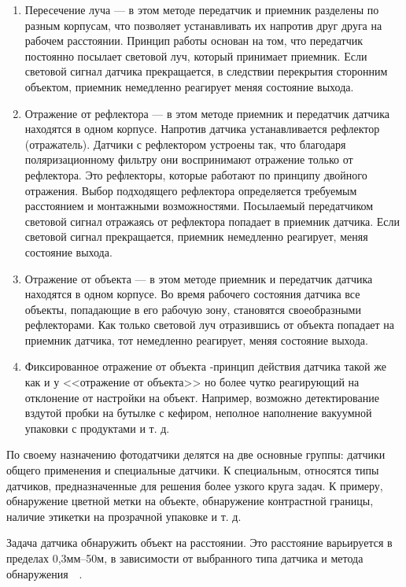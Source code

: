 \begin{enumerate}
    \item Пересечение луча --- в этом методе передатчик и приемник разделены по разным корпусам, что позволяет устанавливать их напротив друг друга на рабочем расстоянии. Принцип работы основан на том, что передатчик постоянно посылает световой луч, который принимает приемник. Если световой сигнал датчика прекращается, в следствии перекрытия сторонним объектом, приемник немедленно реагирует меняя состояние выхода.
    \item Отражение от рефлектора --- в этом методе приемник и передатчик датчика находятся в одном корпусе. Напротив датчика устанавливается рефлектор (отражатель). Датчики с рефлектором устроены так, что благодаря поляризационному фильтру они воспринимают отражение только от рефлектора. Это рефлекторы, которые работают по принципу двойного отражения. Выбор подходящего рефлектора определяется требуемым расстоянием и монтажными возможностями. Посылаемый передатчиком световой сигнал отражаясь от рефлектора попадает в приемник датчика. Если световой сигнал прекращается, приемник немедленно реагирует, меняя состояние выхода.
    \item Отражение от объекта --- в этом методе приемник и передатчик датчика находятся в одном корпусе. Во время рабочего состояния датчика все объекты, попадающие в его рабочую зону, становятся своеобразными рефлекторами. Как только световой луч отразившись от объекта попадает на приемник датчика, тот немедленно реагирует, меняя состояние выхода.
    \item Фиксированное отражение от объекта -принцип действия датчика такой же как и у <<отражение от объекта>> но более чутко реагирующий на отклонение от настройки на объект. Например, возможно детектирование вздутой пробки на бутылке с кефиром, неполное наполнение вакуумной упаковки с продуктами и т. д. 
\end{enumerate}

По своему назначению фотодатчики делятся на две основные группы: датчики общего применения и специальные датчики. К специальным, относятся типы датчиков, предназначенные для решения более узкого круга задач. К примеру, обнаружение цветной метки на объекте, обнаружение контрастной границы, наличие этикетки на прозрачной упаковке и т. д.

Задача датчика обнаружить объект на расстоянии. Это расстояние варьируется в пределах 0,3мм--50м, в зависимости от выбранного типа датчика и метода обнаружения~\cite{gordin:automatics}~\cite{gustav:digital}.

